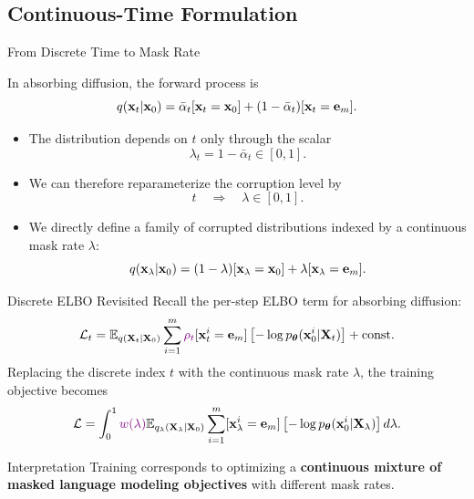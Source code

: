 \documentclass{beamer}
\begin{document}
\subsection{Continuous-Time Formulation}
\begin{frame}{From Discrete Time to Mask Rate}

    In absorbing diffusion, the forward process is
    \[
        q(\mathbf{x}_t | \mathbf{x}_0) =
        \bar\alpha_t[\mathbf{x}_t=\mathbf{x}_0]
        +
        (1-\bar\alpha_t)[\mathbf{x}_t=\mathbf{e}_m].
    \]
	\vspace{-0.5cm}
    \eqpause
	\begin{itemize}
		\item The distribution depends on $t$ only through the scalar
		\[
			\lambda_t = 1-\bar\alpha_t \in [0,1].
		\]
		\vspace{-0.5cm}
    	\eqpause
		\item We can therefore reparameterize the corruption level by
		\[
			t \quad \Rightarrow \quad \lambda \in [0,1].
		\]
		\vspace{-0.5cm}
		\eqpause
		\item We directly define a family of corrupted distributions indexed by
		a continuous mask rate $\lambda$:
		\[
			q(\mathbf{x}_\lambda | \mathbf{x}_0) =
			(1-\lambda)[\mathbf{x}_{\lambda}=\mathbf{x}_0]
			+ \lambda[\mathbf{x}_{\lambda}=\mathbf{e}_m].
		\]
	\end{itemize}
\end{frame}
\begin{frame}{Discrete ELBO Revisited}
    Recall the per-step ELBO term for absorbing diffusion:
    \[
        \mathcal{L}_t
        =
        \mathbb{E}_{q(\mathbf{X}_t | \mathbf{X}_0)}
        \sum_{i=1}^m
        {\color{violet}\rho_t}[\mathbf{x}_t^i=\mathbf e_m]
        \left[-\log p_{\boldsymbol{\theta}}(\mathbf{x}_0^i | \mathbf{X}_t)\right]
        + \text{const}.
    \]
    \eqpause
    Replacing the discrete index $t$ with the continuous mask rate $\lambda$,
    the training objective becomes
    \[
        \mathcal L
        =
        \int_0^1
       {\color{violet} w(\lambda)}
        \mathbb{E}_{q_\lambda(\mathbf{X}_\lambda | \mathbf{X}_0)}
        \sum_{i=1}^m
        [\mathbf{x}_\lambda^i=\mathbf e_m]
        \left[-\log p_{\boldsymbol{\theta}}(\mathbf{x}_0^i | \mathbf{X}_\lambda)\right] 
		d\lambda.
    \]
    \eqpause
	\begin{block}{Interpretation}
        Training corresponds to optimizing a \textbf{continuous mixture of
        masked language modeling objectives} with different mask rates.
    \end{block}
\end{frame}
\end{document}
